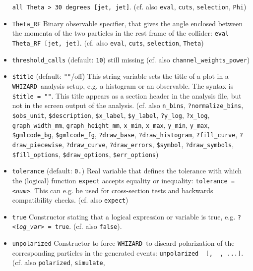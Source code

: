 \documentclass[12pt]{book}
\newcommand{\ttt}[1]{\texttt{#1}}
\newcommand{\whizard}{\texttt{WHIZARD}}
\begin{document}
\begin{itemize}
\ttt{all Theta > 30 degrees [jet, jet]}. (cf. also \ttt{eval},
\ttt{cuts}, \ttt{selection}, \ttt{Phi}) 
\item
\ttt{Theta\_RF} \newline
Binary observable specifier, that gives the angle enclosed
between the momenta of the two particles in the rest frame of the
collider: \ttt{eval Theta\_RF [jet, jet]}. (cf. also \ttt{eval},
\ttt{cuts}, \ttt{selection}, \ttt{Theta}) 
\item
{\color{red} \ttt{threshold\_calls} \qquad (default: \ttt{10})
  \newline 
still missing (cf. also \ttt{channel\_weights\_power})}
\item
\ttt{\$title} \qquad (default: \ttt{""}/off) \newline
This string variable sets the title of a plot in a \whizard\ analysis
setup, e.g. a histogram or an observable. The syntax is \ttt{\$title =
  "{\em <your title>}"}. This title appears as a section header in the
analysis file, but not in the screen output of the analysis.
 (cf. also 
\ttt{n\_bins}, \ttt{?normalize\_bins}, \ttt{\$obs\_unit},
\ttt{\$description}, \ttt{\$x\_label},
\ttt{\$y\_label}, \ttt{?y\_log}, \ttt{?x\_log},
\ttt{graph\_width\_mm}, \ttt{graph\_height\_mm}, 
\ttt{x\_min}, \ttt{x\_max}, \ttt{y\_min}, \ttt{y\_max},
\ttt{\$gmlcode\_bg}, \ttt{\$gmlcode\_fg}, \ttt{?draw\_base},
\ttt{?draw\_histogram}, \ttt{?fill\_curve}, \ttt{?draw\_piecewise}, 
\newline \ttt{?draw\_curve}, \ttt{?draw\_errors}, \ttt{\$symbol}, 
\ttt{?draw\_symbols}, \ttt{\$fill\_options}, \ttt{\$draw\_options},
\ttt{\$err\_options})
\item
\ttt{tolerance} \qquad (default: \ttt{0.}) \newline
Real variable that defines the tolerance with which the (logical)
function \ttt{expect} accepts equality or inequality:
\ttt{tolerance = {\em <num>}}. This can e.g. be used for cross-section tests
and backwards compatibility checks.
(cf. also \ttt{expect})
\item
\ttt{true} \newline
Constructor stating that a logical expression or variable is true,
e.g. \ttt{?{\em <log\_var>} = true}. (cf. also \ttt{false}).
\item
\ttt{unpolarized} \newline
Constructor to force \whizard\ to discard polarization of the
corresponding particles in the generated events: \ttt{unpolarized {\em <prt1>}
  [, {\em <prt2>} , ...]}. (cf. also \ttt{polarized}, \ttt{simulate},

\end{itemize}
\end{document}

